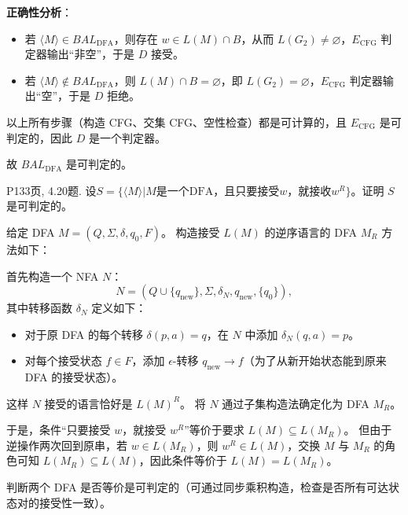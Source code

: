 \documentclass[11pt,addpoints,answers]{exam}
\begin{document}
\begin{questions}
\begin{solution}
        \textbf{正确性分析}：
        \begin{itemize}
            \item 若 \(\langle M \rangle \in BAL_{\text{DFA}}\)，则存在 \(w \in L(M) \cap B\)，从而 \(L(G_2) \neq \varnothing\)，\(E_{\text{CFG}}\) 判定器输出“非空”，于是 \(D\) 接受。
            \item 若 \(\langle M \rangle \notin BAL_{\text{DFA}}\)，则 \(L(M) \cap B = \varnothing\)，即 \(L(G_2) = \varnothing\)，\(E_{\text{CFG}}\) 判定器输出“空”，于是 \(D\) 拒绝。
        \end{itemize}
        
        以上所有步骤（构造 CFG、交集 CFG、空性检查）都是可计算的，且 \(E_{\text{CFG}}\) 是可判定的，因此 \(D\) 是一个判定器。  
        
        故 \(BAL_{\text{DFA}}\) 是可判定的。
	\end{solution}  
	
	
	
	\question P133页, 4.20题.
	设$S=\{\langle M\rangle|M\text{是一个DFA，且只要接受}w\text{，就接收}w^R\}$。证明 $S$ 是可判定的。
	\begin{solution}
		给定 DFA \(M = (Q, \Sigma, \delta, q_0, F)\)。  
        构造接受 \(L(M)\) 的逆序语言的 DFA \(M_R\) 方法如下：
        
        首先构造一个 NFA \(N\)：
        \[
        N = (Q \cup \{q_{\text{new}}\}, \Sigma, \delta_N, q_{\text{new}}, \{q_0\}),
        \]
        其中转移函数 \(\delta_N\) 定义如下：
        \begin{itemize}
            \item 对于原 DFA 的每个转移 \(\delta(p,a)=q\)，在 \(N\) 中添加 \(\delta_N(q,a)=p\)。
            \item 对每个接受状态 \(f \in F\)，添加 \(\epsilon\)-转移 \(q_{\text{new}} \to f\)（为了从新开始状态能到原来 DFA 的接受状态）。
        \end{itemize}
        这样 \(N\) 接受的语言恰好是 \(L(M)^R\)。  
        将 \(N\) 通过子集构造法确定化为 DFA \(M_R\)。
        
        于是，条件“只要接受 \(w\)，就接受 \(w^R\)”等价于要求 \(L(M) \subseteq L(M_R)\)。  
        但由于逆操作两次回到原串，若 \(w \in L(M_R)\)，则 \(w^R \in L(M)\)，交换 \(M\) 与 \(M_R\) 的角色可知 \(L(M_R) \subseteq L(M)\)，因此条件等价于 \(L(M) = L(M_R)\)。
        
        判断两个 DFA 是否等价是可判定的（可通过同步乘积构造，检查是否所有可达状态对的接受性一致）。  
        

\end{solution}
\end{questions}
\end{document}

